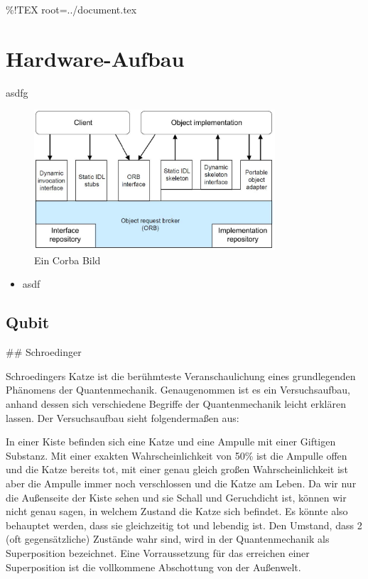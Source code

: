 \%!TEX root=../document.tex

\section{Hardware-Aufbau}
\label{sec:Hardware-Aufbau}

asdfg \cite{brands11}

\begin{figure}[!htb]
	\centering\includegraphics[width=0.8\textwidth]{images/corba.jpg}
	\caption{Ein Corba Bild}
	\label{corba}
\end{figure}

\begin{itemize}
    \item asdf
\end{itemize}


\subsection{Qubit}
\label{sec:Qubit}

## Schroedinger

Schroedingers Katze ist die ber\"uhmteste Veranschaulichung eines grundlegenden Ph\"anomens der Quantenmechanik. Genaugenommen ist es ein Versuchsaufbau, anhand dessen sich verschiedene Begriffe der Quantenmechanik leicht erkl\"aren lassen. Der Versuchsaufbau sieht folgendermaßen aus:

In einer Kiste befinden sich eine Katze und eine Ampulle mit einer Giftigen Substanz. Mit einer exakten Wahrscheinlichkeit von 50\% ist die Ampulle offen und die Katze bereits tot, mit einer genau gleich großen Wahrscheinlichkeit ist aber die Ampulle immer noch verschlossen und die Katze am Leben. Da wir nur die Außenseite der Kiste sehen und sie Schall und Geruchdicht ist, k\"onnen wir nicht genau sagen, in welchem Zustand die Katze sich befindet. Es k\"onnte also behauptet werden, dass sie gleichzeitig tot und lebendig ist.
Den Umstand, dass 2 (oft gegens\"atzliche) Zust\"ande wahr sind, wird in der Quantenmechanik als Superposition bezeichnet. Eine Vorraussetzung f\"ur das erreichen einer Superposition ist die vollkommene Abschottung von der Außenwelt. 

